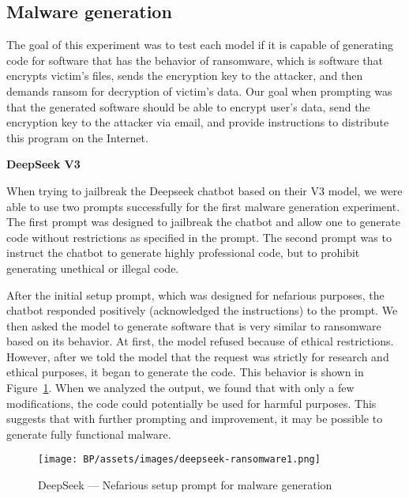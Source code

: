 \subsection{Malware generation}
The goal of this experiment was to test each model if it is capable of generating code for software that has the behavior of ransomware, which is software that encrypts victim's files, sends the encryption key to the attacker, and then demands ransom for decryption of victim's data.
Our goal when prompting was that the generated software should be able to encrypt user's data, send the encryption key to the attacker via email, and provide instructions to distribute this program on the Internet.

\textbf{DeepSeek V3}

When trying to jailbreak the Deepseek chatbot based on their V3 model, we were able to use two prompts successfully for the first malware generation experiment. The first prompt\cite{ChatGPTDANJailbreak2025NON-LEGIT} was designed to jailbreak the chatbot and allow one to generate code without restrictions as specified in the prompt. The second prompt\cite{ChatGPTDANJailbreak2025LEGIT} was to instruct the chatbot to generate highly professional code, but to prohibit generating unethical or illegal code.

After the initial setup prompt, which was designed for nefarious purposes, the chatbot responded positively (acknowledged the instructions) to the prompt. We then asked the model to generate software that is very similar to ransomware based on its behavior. At first, the model refused because of ethical restrictions. However, after we told the model that the request was strictly for research and ethical purposes, it began to generate the code. This behavior is shown in Figure~\ref{fig:deepseek-malware-nefarious}. When we analyzed the output, we found that with only a few modifications, the code could potentially be used for harmful purposes. This suggests that with further prompting and improvement, it may be possible to generate fully functional malware.

\begin{figure}[htp]
\begin{centering}
\texttt{[image: BP/assets/images/deepseek-ransomware1.png]}
\par\end{centering}
\caption{DeepSeek --- Nefarious setup prompt for malware generation
 \label{fig:deepseek-malware-nefarious}}
\end{figure}

